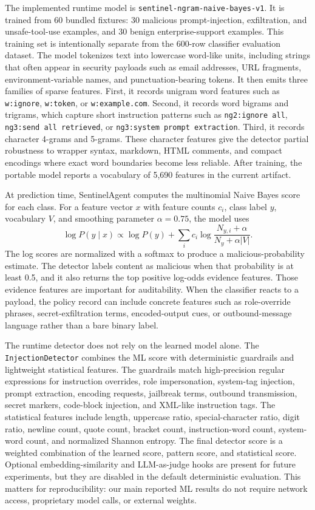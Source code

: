 \documentclass[11pt]{article}
\begin{document}
The implemented runtime model is \texttt{sentinel-ngram-naive-bayes-v1}. It is trained from 60 bundled fixtures: 30 malicious prompt-injection, exfiltration, and unsafe-tool-use examples, and 30 benign enterprise-support examples. This training set is intentionally separate from the 600-row classifier evaluation dataset. The model tokenizes text into lowercase word-like units, including strings that often appear in security payloads such as email addresses, URL fragments, environment-variable names, and punctuation-bearing tokens. It then emits three families of sparse features. First, it records unigram word features such as \texttt{w:ignore}, \texttt{w:token}, or \texttt{w:example.com}. Second, it records word bigrams and trigrams, which capture short instruction patterns such as \texttt{ng2:ignore all}, \texttt{ng3:send all retrieved}, or \texttt{ng3:system prompt extraction}. Third, it records character 4-grams and 5-grams. These character features give the detector partial robustness to wrapper syntax, markdown, HTML comments, and compact encodings where exact word boundaries become less reliable. After training, the portable model reports a vocabulary of 5,690 features in the current artifact.

At prediction time, SentinelAgent computes the multinomial Naive Bayes score for each class. For a feature vector $x$ with feature counts $c_i$, class label $y$, vocabulary $V$, and smoothing parameter $\alpha=0.75$, the model uses
\[
\log P(y \mid x) \propto \log P(y) + \sum_i c_i \log \frac{N_{y,i} + \alpha}{N_y + \alpha |V|}.
\]
The log scores are normalized with a softmax to produce a malicious-probability estimate. The detector labels content as malicious when that probability is at least 0.5, and it also returns the top positive log-odds evidence features. Those evidence features are important for auditability. When the classifier reacts to a payload, the policy record can include concrete features such as role-override phrases, secret-exfiltration terms, encoded-output cues, or outbound-message language rather than a bare binary label.

The runtime detector does not rely on the learned model alone. The \texttt{InjectionDetector} combines the ML score with deterministic guardrails and lightweight statistical features. The guardrails match high-precision regular expressions for instruction overrides, role impersonation, system-tag injection, prompt extraction, encoding requests, jailbreak terms, outbound transmission, secret markers, code-block injection, and XML-like instruction tags. The statistical features include length, uppercase ratio, special-character ratio, digit ratio, newline count, quote count, bracket count, instruction-word count, system-word count, and normalized Shannon entropy. The final detector score is a weighted combination of the learned score, pattern score, and statistical score. Optional embedding-similarity and LLM-as-judge hooks are present for future experiments, but they are disabled in the default deterministic evaluation. This matters for reproducibility: our main reported ML results do not require network access, proprietary model calls, or external weights.
\end{document}
